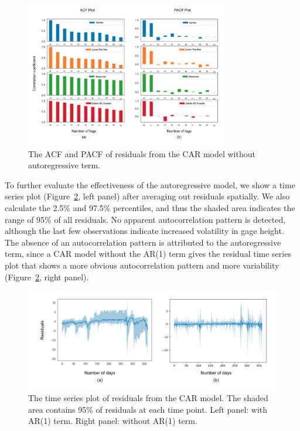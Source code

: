 \documentclass{svjour3}
\renewcommand\hl[1]{#1}
\begin{document}
\begin{figure}[htbp]
\begin{center}
\includegraphics[width=0.8\textwidth]{../images/acf_and_pacf_for_residuals.png}
\caption{\hl{The ACF and PACF of residuals from the CAR model without autoregressive term.}}
\label{fig:ACF_and_PACF}
\end{center}
\end{figure}

To further evaluate the effectiveness of the autoregressive model, we show a time series plot (Figure~\ref{fig:resid_time_series}, left panel) after averaging out residuals spatially.
We also calculate the 2.5\% and 97.5\% percentiles, and thus the shaded area indicates the range of 95\% of all residuals.
 No apparent autocorrelation pattern is detected, although the last few  observations indicate increased volatility in  gage height.
 The absence of an autocorrelation pattern is attributed to the autoregressive term, since a  CAR model without the AR(1) term gives the residual time series plot that shows a more obvious autocorrelation  pattern and more variability (Figure~\ref{fig:resid_time_series}, right panel).\\

\begin{figure}[htbp]
\centering
\includegraphics[width=1\textwidth]{../images/residuals_over_time_for_ar_and_non_ar.png}
\caption{\hl{The time series plot of residuals from the CAR model. The shaded area contains {95\%} of residuals at each time point. Left panel: with AR(1) term. Right panel: without AR(1) term.}}
\label{fig:resid_time_series}
\end{figure}
\end{document}
